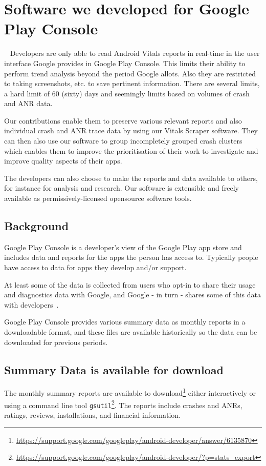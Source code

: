 \section{Software we developed for Google Play Console}~\label{software-we-developed-for-google-play-console}
Developers are only able to read Android Vitals reports in real-time in the user interface Google provides in Google Play Console. This limits their ability to perform trend analysis beyond the period Google allots. Also they are restricted to taking screenshots, etc. to save pertinent information. There are several limits, a hard limit of 60 (sixty) days and seemingly limits based on volumes of crash and ANR data. 

Our contributions enable them to preserve various relevant reports and also individual crash and ANR trace data by using our Vitals Scraper software. They can then also use our software to group incompletely grouped crash clusters which enables them to improve the prioritisation of their work to investigate and improve quality aspects of their apps.

The developers can also choose to make the reports and data available to others, for instance for analysis and research. Our software is extensible and freely available as permissively-licensed opensource software tools. 

\subsection{Background}
Google Play Console is a developer's view of the Google Play app store and includes data and reports for the apps the person has access to. Typically people have access to data for apps they develop and/or support.

At least some of the data is collected from users who opt-in to share their usage and diagnostics data with Google, and Google - in turn - shares some of this data with developers~\cite{google_play_share_usage_and_diagnostics_info_with_google}.

Google Play Console provides various summary data as monthly reports in a downloadable format, and these files are available historically so the data can be downloaded for previous periods. 

\subsection{Summary Data is available for download}
The monthly summary reports are available to download\footnote{\url{https://support.google.com/googleplay/android-developer/answer/6135870}} either interactively or using a command line tool \texttt{gsutil}\footnote{\url{https://support.google.com/googleplay/android-developer/?p=stats\_export}}. The reports include crashes and ANRs, ratings, reviews, installations, and financial information. 

